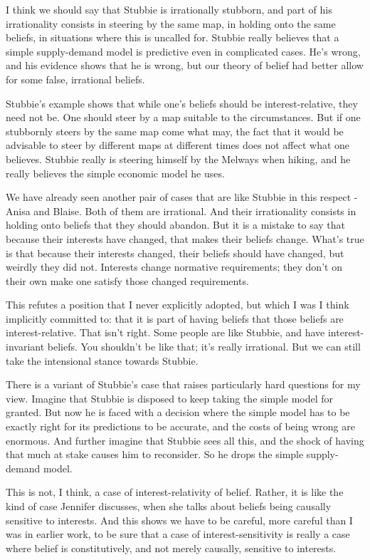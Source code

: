 \documentclass[11pt,]{book}
\begin{document}
I think we should say that Stubbie is irrationally stubborn, and part of his irrationality consists in steering by the same map, in holding onto the same beliefs, in situations where this is uncalled for. Stubbie really believes that a simple supply-demand model is predictive even in complicated cases. He's wrong, and his evidence shows that he is wrong, but our theory of belief had better allow for some false, irrational beliefs.

Stubbie's example shows that while one's beliefs should be interest-relative, they need not be. One should steer by a map suitable to the circumstances. But if one stubbornly steers by the same map come what may, the fact that it would be advisable to steer by different maps at different times does not affect what one believes. Stubbie really is steering himself by the Melways when hiking, and he really believes the simple economic model he uses.

We have already seen another pair of cases that are like Stubbie in this respect - Anisa and Blaise. Both of them are irrational. And their irrationality consists in holding onto beliefs that they should abandon. But it is a mistake to say that because their interests have changed, that makes their beliefs change. What's true is that because their interests changed, their beliefs should have changed, but weirdly they did not. Interests change normative requirements; they don't on their own make one satisfy those changed requirements.

This refutes a position that I never explicitly adopted, but which I was I think implicitly committed to: that it is part of having beliefs that those beliefs are interest-relative. That isn't right. Some people are like Stubbie, and have interest-invariant beliefs. You shouldn't be like that; it's really irrational. But we can still take the intensional stance towards Stubbie.

There is a variant of Stubbie's case that raises particularly hard questions for my view. Imagine that Stubbie is disposed to keep taking the simple model for granted. But now he is faced with a decision where the simple model has to be exactly right for its predictions to be accurate, and the costs of being wrong are enormous. And further imagine that Stubbie sees all this, and the shock of having that much at stake causes him to reconsider. So he drops the simple supply-demand model.

This is not, I think, a case of interest-relativity of belief. Rather, it is like the kind of case Jennifer \citet{Nagel2010} discusses, when she talks about beliefs being causally sensitive to interests. And this shows we have to be careful, more careful than I was in earlier work, to be sure that a case of interest-sensitivity is really a case where belief is constitutively, and not merely causally, sensitive to interests.
\end{document}
